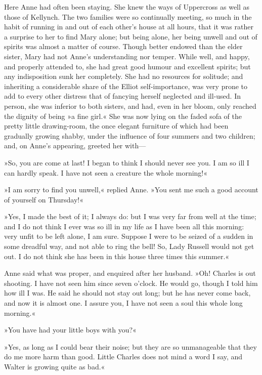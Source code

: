 Here Anne had often been staying. She knew the ways of Uppercross as well as those of Kellynch. The two families were so continually meeting, so much in the habit of running in and out of each other's house at all hours, that it was rather a surprise to her to find Mary alone; but being alone, her being unwell and out of spirits was almost a matter of course. Though better endowed than the elder sister, Mary had not Anne's understanding nor temper. While well, and happy, and properly attended to, she had great good humour and excellent spirits; but any indisposition sunk her completely. She had no resources for solitude; and inheriting a considerable share of the Elliot self-importance, was very prone to add to every other distress that of fancying herself neglected and ill-used. In person, she was inferior to both sisters, and had, even in her bloom, only reached the dignity of being »a fine girl.« She was now lying on the faded sofa of the pretty little drawing-room, the once elegant furniture of which had been gradually growing shabby, under the influence of four summers and two children; and, on Anne's appearing, greeted her with—

»So, you are come at last! I began to think I should never see you. I am so ill I can hardly speak. I have not seen a creature the whole morning!«

»I am sorry to find you unwell,« replied Anne. »You sent me such a good account of yourself on Thursday!«

»Yes, I made the best of it; I always do: but I was very far from well at the time; and I do not think I ever was so ill in my life as I have been all this morning: very unfit to be left alone, I am sure. Suppose I were to be seized of a sudden in some dreadful way, and not able to ring the bell! So, Lady Russell would not get out. I do not think she has been in this house three times this summer.«

Anne said what was proper, and enquired after her husband. »Oh! Charles is out shooting. I have not seen him since seven o'clock. He would go, though I told him how ill I was. He said he should not stay out long; but he has never come back, and now it is almost one. I assure you, I have not seen a soul this whole long morning.«

»You have had your little boys with you?«

»Yes, as long as I could bear their noise; but they are so unmanageable that they do me more harm than good. Little Charles does not mind a word I say, and Walter is growing quite as bad.«

